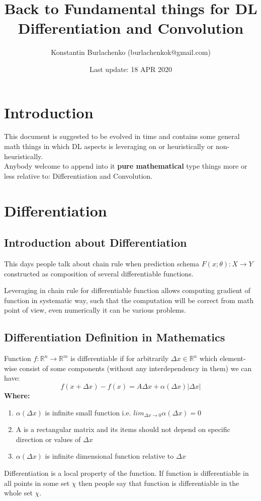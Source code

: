 \documentclass[12pt,a4paper]{article}
\title{\textbf{Back to Fundamental things for DL}\\Differentiation and Convolution}
\date{Last update: 18 APR 2020}
\author{Konstantin Burlachenko (burlachenkok@gmail.com)}
\theoremstyle{plain}
\begin{document}
\maketitle
\tableofcontents
\section{Introduction}
This document is suggested to be evolved in time and contains some general math things in which DL aspects is leveraging on or heuristically or non-heuristically.\\
Anybody welcome to append into it \textbf{pure mathematical} type things more or less relative to: Differentiation and Convolution.
\section{Differentiation}
\subsection{Introduction about Differentiation}
This days people talk about chain rule when prediction schema $F(x;\theta):X \to Y$ constructed as composition of several differentiable functions.

Leveraging in chain rule for differentiable function allows computing gradient of function in systematic way, such that the computation will be correct from math point of view, even numerically it can be various problems.
\subsection{Differentiation Definition in Mathematics}
Function $f:\mathbb{R}^{n} \rightarrow \mathbb{R}^{m}$ 
is differentiable if for arbitrarily $\varDelta x \in \mathbb{R}^{n}$ which element-wise consist of some components (without any interdependency in them) we can have:
\begin{equation}
f(x+\varDelta x)-f(x) = A \varDelta x + \alpha(\varDelta x)|\varDelta x|
\end{equation} 
\textbf{Where:}
\begin{enumerate}
 \item $\alpha(\varDelta x)$ is infinite small function i.e. $lim_{\varDelta x \rightarrow 0} \alpha(\varDelta x) = 0$
 \item A is a rectangular matrix and its items should not depend on specific direction or values of $\varDelta x$
 \item $\alpha(\varDelta x)$ is infinite dimensional function relative to $\varDelta x$
\end{enumerate}
Differentiation is a local property of the function. If function is differentiable in all points in some set $\chi$ then people say that function is differentiable in the whole set $\chi$.
\\
\end{document}

